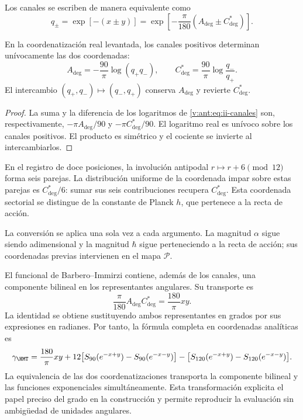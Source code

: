 Los canales se escriben de manera equivalente como
\begin{equation}
 q_\pm=\exp[-(x\pm y)]
 =\exp\!\left[-\frac{\pi}{180}(A_{\deg}\pm C^*_{\deg})\right].
\label{v:ant:eq:ii-canales}
\end{equation}
\begin{proposition}
\label{v:ant:prop:ii-inversion-canales-angulares}
En la coordenatización real levantada, los canales positivos determinan
unívocamente las dos coordenadas:
\[
 A_{\deg}=-\frac{90}{\pi}\log(q_+q_-),\qquad
 C^*_{\deg}=\frac{90}{\pi}\log\frac{q_-}{q_+}.
\]
El intercambio \((q_+,q_-)\mapsto(q_-,q_+)\) conserva
\(A_{\deg}\) y revierte \(C^*_{\deg}\).
\end{proposition}
\begin{proof}
La suma y la diferencia de los logaritmos de
\eqref{v:ant:eq:ii-canales} son, respectivamente,
\(-\pi A_{\deg}/90\) y \(-\pi C^*_{\deg}/90\).
El logaritmo real es unívoco sobre los canales positivos.
El producto es simétrico y el cociente se invierte al intercambiarlos.
\end{proof}
En el registro de doce posiciones, la involución antipodal
\(r\mapsto r+6\pmod {12}\) forma seis parejas. La distribución
uniforme de la coordenada impar sobre estas parejas es
\(C^*_{\deg}/6\): sumar sus seis contribuciones recupera
\(C^*_{\deg}\). Esta coordenada sectorial se distingue de
la constante de Planck \(h\), que pertenece a la recta de acción.

La conversión se aplica una sola vez a cada argumento. La magnitud
\(\alpha\) sigue siendo adimensional y la magnitud \(\hbar\)
sigue perteneciendo a la recta de acción; sus coordenadas previas
intervienen en el mapa \(\mathcal P\).

El funcional de Barbero--Immirzi contiene, además de los canales, una
componente bilineal en los representantes angulares. Su transporte es
\begin{equation}
 \frac{\pi}{180}A_{\deg}C^*_{\deg}
 =\frac{180}{\pi}xy.
 \label{v:ant:eq:ii-barbero-cartas}
\end{equation}
La identidad se obtiene sustituyendo ambos representantes en grados
por sus expresiones en radianes. Por tanto, la fórmula completa en
coordenadas analíticas es
\[
 \gamma_{\HMT}
 =\frac{180}{\pi}xy
 +12\bigl[S_{90}(e^{-x+y})-S_{90}(e^{-x-y})\bigr]
 -\bigl[S_{120}(e^{-x+y})-S_{120}(e^{-x-y})\bigr].
\]
La equivalencia de las dos coordenatizaciones transporta la componente bilineal
y las funciones exponenciales simultáneamente. Esta transformación
explicita el papel preciso del grado en la construcción y permite
reproducir la evaluación sin ambigüedad de unidades angulares.
